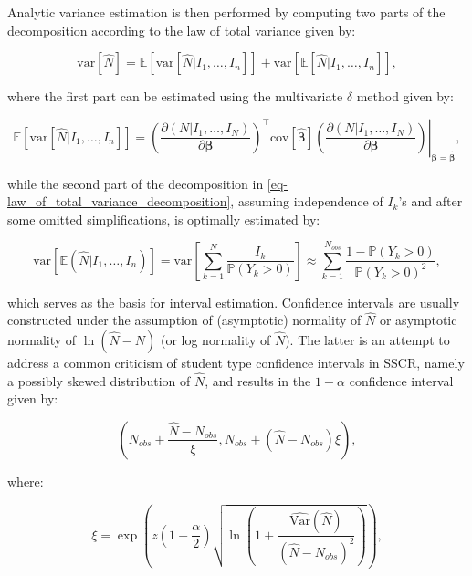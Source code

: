 \documentclass[nojss]{jss}
\newcommand{\1}{\mathcal{I}} \newcommand{\bZero}{\boldsymbol{0}}
\begin{document}
Analytic variance estimation is then performed by computing two parts of
the decomposition according to the law of total variance given by:

\begin{equation}\label{eq-law_of_total_variance_decomposition}
  \text{var}[\hat{N}] = \mathbb{E}\left[\text{var}
  \left[\hat{N}|I_{1},\dots,I_{n}\right]\right] +
  \text{var}\left[\mathbb{E}[\hat{N}|I_{1},\dots,I_{n}]\right],
\end{equation}

where the first part can be estimated using the multivariate \(\delta\)
method given by:

\begin{equation*}
  \mathbb{E}\left[\text{var} \left[\hat{N}|I_{1},\dots,I_{n}\right]\right] =
  \left.\left(\frac{\partial(N|I_1,\dots,I_N)}{\partial\boldsymbol{\beta}}\right)^\top
  \text{cov}\left[\hat{\boldsymbol{\beta}}\right]
  \left(\frac{\partial(N|I_1,\dots,I_N)}{\partial\boldsymbol{\beta}}\right)
  \right|_{\boldsymbol{\beta}=\hat{\boldsymbol{\beta}}},
\end{equation*}

while the second part of the decomposition in
\eqref{eq-law_of_total_variance_decomposition}, assuming independence of
\(I_{k}\)'s and after some omitted simplifications, is optimally
estimated by:

\begin{equation*}
  \text{var}\left[\mathbb{E}(\hat{N}|I_{1},\dots,I_{n})\right] =
  \text{var}\left[\sum_{k=1}^{N}\frac{I_{k}}{\mathbb{P}(Y_{k}>0)}\right]
  \approx\sum_{k=1}^{N_{obs}}\frac{1-\mathbb{P}(Y_{k}>0)}{\mathbb{P}(Y_{k}>0)^{2}},
\end{equation*}

which serves as the basis for interval estimation. Confidence intervals
are usually constructed under the assumption of (asymptotic) normality
of \(\hat{N}\) or asymptotic normality of \(\ln(\hat{N}-N)\) (or log
normality of \(\hat{N}\)). The latter is an attempt to address a common
criticism of student type confidence intervals in SSCR, namely a
possibly skewed distribution of \(\hat{N}\), and results in the
\(1-\alpha\) confidence interval given by:

\begin{equation*}
  \left(N_{obs}+\frac{\hat{N}-N_{obs}}{\xi},N_{obs} +
  \left(\hat{N}-N_{obs}\right)\xi\right),
\end{equation*}

where:

\begin{equation*}
  \xi = \exp\left(z\left(1-\frac{\alpha}{2}\right)
  \sqrt{\ln\left(1+\frac{\widehat{\text{Var}}(\hat{N})}{\left(\hat{N}-N_{obs}\right)^{2}}\right)}\right),
\end{equation*}
\end{document}
